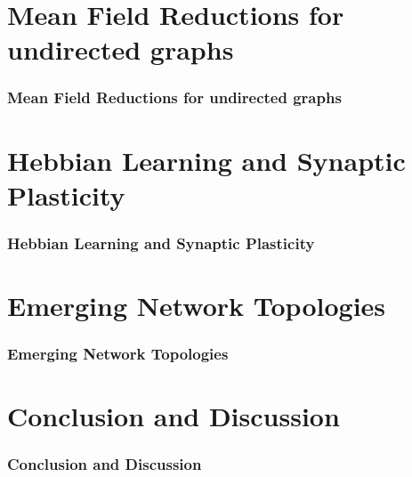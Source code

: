 \section{\mywork Mean Field Reductions for undirected graphs} 
\begin{frame}
\frametitle{\mywork Mean Field Reductions for undirected graphs} 
\end{frame}


\section{Hebbian Learning and Synaptic Plasticity} 
\begin{frame}
\frametitle{Hebbian Learning and Synaptic Plasticity}
\end{frame}


\section{\mywork Emerging Network Topologies} 
\begin{frame}
\frametitle{\mywork Emerging Network Topologies}
\end{frame}


\section{Conclusion and Discussion} 
\begin{frame}
\frametitle{Conclusion and Discussion}
\end{frame}
